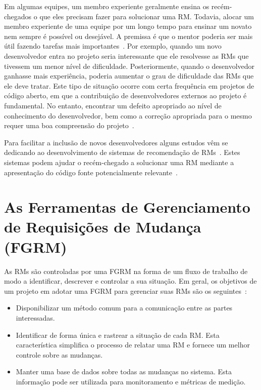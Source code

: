 Em algumas equipes, um membro experiente geralmente ensina os recém-chegados o
que eles precisam fazer para solucionar uma RM\@. Todavia, alocar um membro
experiente de uma equipe por um longo tempo para ensinar um novato nem sempre é
possível ou desejável. A premissa é que o mentor poderia ser mais útil fazendo
tarefas mais importantes~\cite{malheiros2012source}. Por exemplo, quando um novo
desenvolvedor entra no projeto seria interessante que ele resolvesse as RMs que
tivessem um menor nível de dificuldade. Posteriormente, quando o desenvolvedor
ganhasse mais experiência, poderia aumentar o grau de dificuldade das RMs que
ele deve tratar. Este tipo de situação ocorre com certa frequência em projetos
de código aberto, em que a contribuição de desenvolvedores externos ao projeto é
fundamental. No entanto, encontrar um defeito apropriado ao nível de
conhecimento do desenvolvedor, bem como a correção apropriada para o mesmo
requer uma boa compreensão do projeto~\cite{Wang2011bug}.

Para facilitar a inclusão de novos desenvolvedores alguns estudos vêm se
dedicando ao desenvolvimento de sistemas de recomendação de
RMs~\cite{malheiros2012source, Wang2011bug}. Estes sistemas podem ajudar o
recém-chegado a solucionar uma RM mediante a apresentação do código fonte
potencialmente relevante~\cite{malheiros2012source}.

\section{As Ferramentas de Gerenciamento de Requisições de Mudança (FGRM)}\label{sec:ferramentas_de_gerenciamento_requisicoes_de_mudanca}

As RMs são controladas por uma FGRM na forma de um fluxo de trabalho de modo a
identificar, descrever e controlar a sua situação. Em geral, os objetivos de um
projeto em adotar uma FGRM para gerenciar suas RMs são os
seguintes~\cite{tripathy2014software}:

\begin{itemize}
    \item Disponibilizar um método comum para a comunicação entre as partes
        interessadas.
	\item Identificar de forma única e rastrear a situação de cada RM\@. Esta
		característica simplifica o processo de relatar uma RM e fornece um
		melhor controle sobre as mudanças.
    \item Manter uma base de dados sobre todas as mudanças no sistema. Esta
        informação pode ser utilizada para monitoramento e métricas de medição.
\end{itemize}

